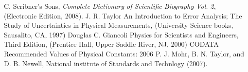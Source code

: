 \documentclass[aps,pre,twocolumn,nofootinbib]{revtex4}
\begin{document}
	\begin{thebibliography}{99}
 C. Scribner's Sons, \textit{Complete Dictionary of Scientific Biography Vol. 2},
  (Electronic Edition, 2008).
 J. R. Taylor An Introduction to Error Analysis; The Study of Uncertainties in Physical Measurements, (University Science books, Sausalito, CA, 1997)
 Douglas C. Giancoli Physics for Scientists and Engineers, Third Edition, (Prentice Hall, Upper Saddle River, NJ, 2000)
 CODATA Recommended Values of Physical Constants: 2006 P. J. Mohr, B. N. Taylor, and D. B. Newell, National institute of Standards and Technlogy (2007).
	\end{thebibliography}
	
	
\end{document}

